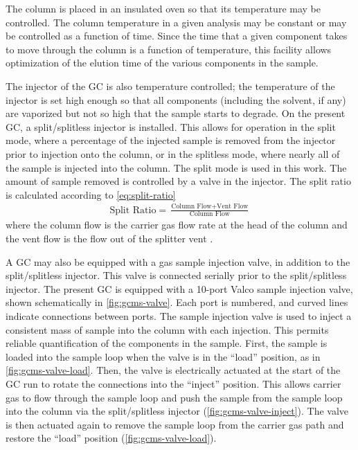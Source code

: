\documentclass[../main.tex]{subfiles}
\begin{document}
The column is placed in an insulated oven so that its temperature may be
controlled. The column temperature in a given analysis may be constant
or may be controlled as a function of time. Since the time that a given
component takes to move through the column is a function of temperature,
this facility allows optimization of the elution time of the various
components in the sample.

The injector of the GC is also temperature controlled; the temperature of
the injector is set high enough so that all components (including the solvent,
if any) are vaporized but not so high that the sample starts to degrade. On the present GC,
a split/splitless injector is installed. This allows for operation in the
split mode, where a percentage of the injected sample is removed from the
injector prior to injection onto the column, or in the splitless mode,
where nearly all of the sample is injected into the column. The split mode
is used in this work. The amount of sample removed is controlled by a valve
in the injector. The split ratio is calculated according to \cref{eq:split-ratio}
%
\begin{gather}
\label{eq:split-ratio}
\text{Split Ratio} = \frac{\text{Column Flow} +\text{Vent Flow}}{\text{Column Flow}}
\end{gather}
%
where the column flow is the carrier gas flow rate at the head of the column
and the vent flow is the flow out of the splitter vent \cite{Sparkman2011a}.

A GC may also be equipped with a gas sample injection valve, in addition to the
split/splitless injector. This valve is connected serially prior to the
split/splitless injector. The present GC is equipped with a 10-port Valco sample
injection valve, shown schematically in \cref{fig:gcms-valve}.
Each port is numbered, and curved lines indicate connections between ports.
The sample injection valve is used to inject a consistent mass of sample into the column
with each injection. This permits reliable quantification of the
components in the sample. First, the sample is loaded into the sample loop
when the valve is in the ``load'' position, as in \cref{fig:gcms-valve-load}.
Then, the valve is electrically actuated at the start of the
GC run to rotate the connections into the
``inject'' position. This allows carrier gas to flow through the sample loop and push
the sample from the sample loop into the column via the split/splitless injector (\cref{fig:gcms-valve-inject}).
The valve is then actuated again to remove the sample loop
from the carrier gas path and restore the ``load'' position (\cref{fig:gcms-valve-load}).
\end{document}
